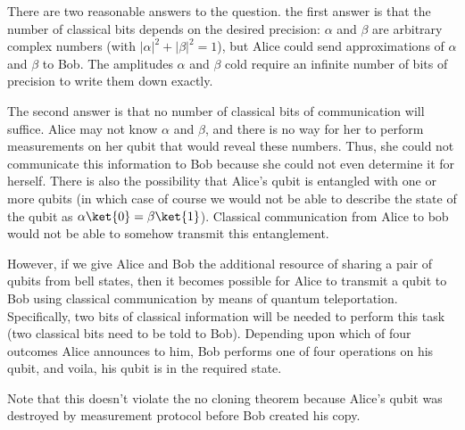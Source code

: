 \documentclass[12pt, oneside]{book}
\theoremstyle{definition}
\theoremstyle{definition}
\theoremstyle{remark}
\begin{document}
There are two reasonable answers to the question. the first answer is that the number of classical bits depends on the desired precision: $\alpha$ and $\beta$ are arbitrary complex numbers (with $|\alpha|^2 +|\beta|^2=1$), but Alice could send approximations of $\alpha$ and $\beta$ to Bob. The amplitudes $\alpha$ and $\beta$ cold require an infinite number of bits of precision to write them down exactly.

The second answer is that no number of classical bits of communication will suffice. Alice may not know $\alpha$ and $\beta$, and there is no way for her to perform measurements on her qubit that would reveal these numbers. Thus, she could not communicate this information to Bob because she could not even determine it for herself. There is also the possibility that Alice's qubit is entangled with one or more qubits (in which case of course we would not be able to describe the state of the qubit as $\alpha\ket{0}=\beta\ket{1}$). Classical communication from Alice to bob would not be able to somehow transmit this entanglement.

However, if we give Alice and Bob the additional resource of sharing a pair of qubits from bell states, then it becomes possible for Alice to transmit a qubit to Bob using classical communication by means of quantum teleportation. Specifically, two bits of classical information will be needed to perform this task (two classical bits need to be told to Bob). Depending upon which of four outcomes Alice announces to him, Bob performs one of four operations on his qubit, and voila, his qubit is in the required state.

Note that this doesn't violate the no cloning theorem because Alice's qubit was destroyed by measurement protocol before Bob created his copy.
\end{document}
